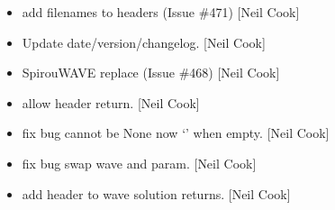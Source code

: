 \documentclass[a4paper,10pt,english]{report}
\begin{document}
\begin{itemize}
\item {} 
 \sphinxhyphen{} add filenames to headers (Issue  \#471) {[}Neil
Cook{]}

\item {} 
Update date/version/changelog. {[}Neil Cook{]}

\item {} 
SpirouWAVE \sphinxhyphen{} replace  (Issue \#468) {[}Neil Cook{]}

\item {} 
 \sphinxhyphen{} allow header return. {[}Neil Cook{]}

\item {} 
 \sphinxhyphen{} fix bug  cannot be None \sphinxhyphen{} now ‘’ when empty.
{[}Neil Cook{]}

\item {} 
 \sphinxhyphen{} fix bug \sphinxhyphen{} swap wave and param. {[}Neil Cook{]}

\item {} 
 \sphinxhyphen{} add header to wave solution returns. {[}Neil
Cook{]}

\end{itemize}
\end{document}

